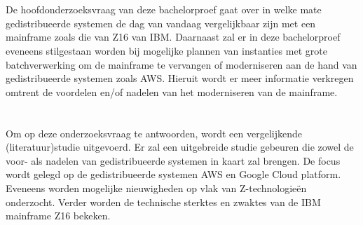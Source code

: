 \section{}
\label{sec:onderzoeksvraag}

De hoofdonderzoeksvraag van deze bachelorproef gaat over in welke mate gedistribueerde systemen de dag van vandaag vergelijkbaar zijn met een mainframe zoals die van Z16 van IBM. Daarnaast zal er in deze bachelorproef eveneens stilgestaan worden bij mogelijke plannen van instanties met grote batchverwerking om de mainframe te vervangen of moderniseren aan de hand van gedistribueerde systemen zoals AWS. Hieruit wordt er meer informatie verkregen omtrent de voordelen en/of nadelen van het moderniseren van de mainframe. 

\section{}
\label{sec:onderzoeksdoelstelling}

\subsection{}

Om op deze onderzoeksvraag te antwoorden, wordt een vergelijkende (literatuur)studie uitgevoerd. Er zal een uitgebreide studie gebeuren die zowel de voor- als nadelen van gedistribueerde systemen in kaart zal brengen. De focus wordt gelegd op de gedistribueerde systemen AWS en Google Cloud platform. Eveneens worden mogelijke nieuwigheden op vlak van Z-technologieën onderzocht. Verder worden de technische sterktes en zwaktes van de IBM mainframe Z16 bekeken.

\subsection{}

